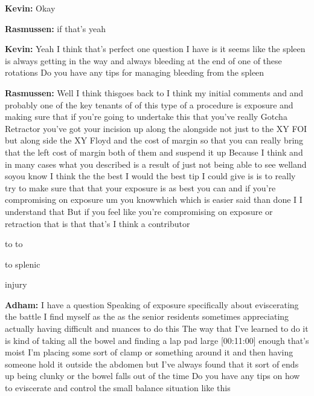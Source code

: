 \documentclass[
]{book}
\begin{document}
\textbf{Kevin:} Okay

\textbf{Rasmussen:} if that's yeah

\textbf{Kevin:} Yeah I think that's perfect one question I have is it seems
like the spleen is always getting in the way and always bleeding at the
end of one of these rotations Do you have any tips for managing bleeding
from the spleen

\textbf{Rasmussen:} Well I think thisgoes back to I think my initial comments
and and probably one of the key tenants of of this type of a procedure
is exposure and making sure that if you're going to undertake this that
you've really Gotcha Retractor you've got your incision up along the
alongside not just to the XY FOI but along side the XY Floyd and the
cost of margin so that you can really bring that the left cost of margin
both of them and suspend it up Because I think and in many cases what
you described is a result of just not being able to see welland soyou
know I think the the best I would the best tip I could give is is to
really try to make sure that that your exposure is as best you can and
if you're compromising on exposure um you knowwhich which is easier said
than done I I understand that But if you feel like you're compromising
on exposure or retraction that is that that's I think a contributor

to to

to splenic

injury

\textbf{Adham:} I have a question Speaking of exposure specifically about
eviscerating the battle I find myself as the as the senior residents
sometimes appreciating actually having difficult and nuances to do this
The way that I've learned to do it is kind of taking all the bowel and
finding a lap pad large {[}00:11:00{]} enough that's moist I'm placing some
sort of clamp or something around it and then having someone hold it
outside the abdomen but I've always found that it sort of ends up being
clunky or the bowel falls out of the time Do you have any tips on how to
eviscerate and control the small balance situation like this
\end{document}
